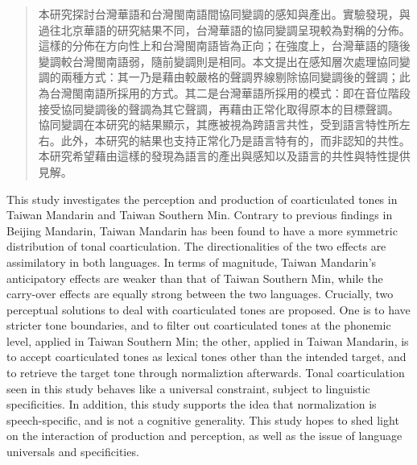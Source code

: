 
\begin{abstract}

本研究探討台灣華語和台灣閩南語間協同變調的感知與產出。實驗發現，與過往北京華語的研究結果不同，台灣華語的協同變調呈現較為對稱的分佈。這樣的分佈在方向性上和台灣閩南語皆為正向；在強度上，台灣華語的隨後變調較台灣閩南語弱，隨前變調則是相同。本文提出在感知層次處理協同變調的兩種方式：其一乃是藉由較嚴格的聲調界線剔除協同變調後的聲調；此為台灣閩南語所採用的方式。其二是台灣華語所採用的模式：即在音位階段接受協同變調後的聲調為其它聲調，再藉由正常化取得原本的目標聲調。
協同變調在本研究的結果顯示，其應被視為跨語言共性，受到語言特性所左右。此外，本研究的結果也支持正常化乃是語言特有的，而非認知的共性。本研究希望藉由這樣的發現為語言的產出與感知以及語言的共性與特性提供見解。

\end{abstract}

\begin{abstract*}

This study investigates the perception and production of coarticulated tones in Taiwan Mandarin and Taiwan Southern Min. Contrary to previous findings in Beijing Mandarin, Taiwan Mandarin has been found to have a more symmetric distribution of tonal coarticulation. The directionalities of the two effects are assimilatory in both languages. In terms of magnitude, Taiwan Mandarin's anticipatory effects are weaker than that of Taiwan Southern Min, while the carry-over effects are equally strong between the two languages. Crucially, two perceptual solutions to deal with coarticulated tones are proposed. One is to have 
stricter tone boundaries, and to filter out coarticulated tones at the phonemic level, applied in Taiwan Southern Min; the other, applied in Taiwan Mandarin, is to accept coarticulated tones as lexical tones other than the intended target, and to retrieve the target tone through normaliztion afterwards. Tonal coarticulation seen in this study behaves like a universal constraint, subject to linguistic specificities. In addition, this study supports the idea that normalization is speech-specific, and is not a cognitive generality. This study hopes to shed light on the interaction of production and perception, as well as the issue of language universals and specificities.

\end{abstract*}